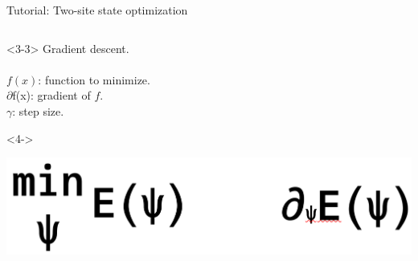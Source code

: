 \begin{frame}[fragile]{Tutorial: Two-site state optimization}
\begin{columns}
\begin{column}{5cm}
\begin{onlyenv}<3-3>
Gradient descent. \\
~\\
$f(x)$: function to minimize. \\
$\partial$f(x): gradient of $f$. \\
$\gamma$: step size. \\
\end{onlyenv}

\begin{onlyenv}<4->
\vspace*{0.0cm}
\begin{center}
\includegraphics[width=1.0\textwidth]{
  slides/assets/min_grad_E_psi.png
}
\end{center}
\vspace*{0.0cm}
\end{onlyenv}

\end{column}

\end{columns}

\end{frame}

